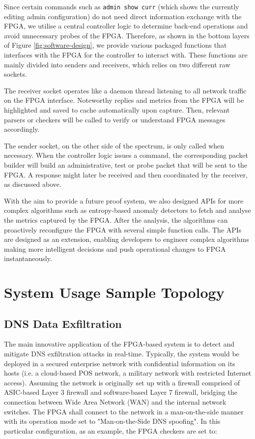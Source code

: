 \documentclass[a4paper]{report}
\newcommand{\code}{\texttt}
\begin{document}
Since certain commands such as \code{admin show curr} (which shows the currently editing admin configuration) do not need direct information exchange with the FPGA, we utilise a central controller logic to determine back-end operations and avoid unnecessary probes of the FPGA. Therefore, as shown in the bottom layers of Figure \ref{fig:software-design}, we provide various packaged functions that interfaces with the FPGA for the controller to interact with. These functions are mainly divided into senders and receivers, which relies on two different raw sockets.

The receiver socket operates like a daemon thread listening to all network traffic on the FPGA interface. Noteworthy replies and metrics from the FPGA will be highlighted and saved to cache automatically upon capture. Then, relevant parsers or checkers will be called to verify or understand FPGA messages accordingly. 

The sender socket, on the other side of the spectrum, is only called when necessary. When the controller logic issues a command, the corresponding packet builder will build an administrative, test or probe packet that will be sent to the FPGA. A response might later be received and then coordinated by the receiver, as discussed above.

With the aim to provide a future proof system, we also designed APIs for more complex algorithms such as entropy-based anomaly detectors to fetch and analyse the metrics captured by the FPGA. After the analysis, the algorithms can proactively reconfigure the FPGA with several simple function calls. The APIs are designed as an extension, enabling developers to engineer complex algorithms making more intelligent decisions and push operational changes to FPGA instantaneously.

\section{System Usage Sample Topology}
\label{section:design-system-usage-sample}

\subsection{DNS Data Exfiltration}

The main innovative application of the FPGA-based system is to detect and mitigate DNS exfiltration attacks in real-time. Typically, the system would be deployed in a secured enterprise network with confidential information on its hosts (i.e. a cloud-based POS network, a military network with restricted Internet access). Assuming the network is originally set up with a firewall comprised of ASIC-based Layer 3 firewall and software-based Layer 7 firewall, bridging the connection between Wide Area Network (WAN) and the internal network switches. The FPGA shall connect to the network in a man-on-the-side manner with its operation mode set to "Man-on-the-Side DNS spoofing".  In this particular configuration, as an example, the FPGA checkers are set to:
\end{document}
